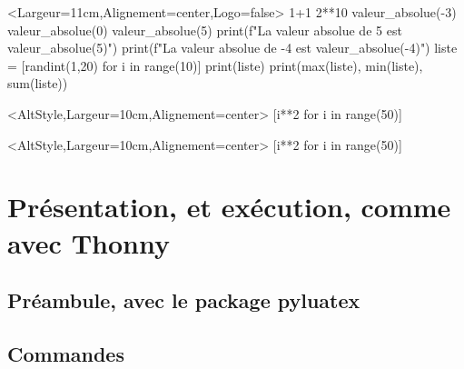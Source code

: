 \documentclass[french,a4paper,10pt]{article}
\begin{document}
\begin{ConsolePiton}<Largeur=11cm,Alignement=center,Logo=false>{}
1+1
2**10
valeur_absolue(-3)
valeur_absolue(0)
valeur_absolue(5)
print(f"La valeur absolue de 5 est {valeur_absolue(5)}")
print(f"La valeur absolue de -4 est {valeur_absolue(-4)}")
liste = [randint(1,20) for i in range(10)]
print(liste)
print(max(liste), min(liste), sum(liste))
\end{ConsolePiton}

{\small \begin{codehigh}
\begin{ConsolePiton}<AltStyle,Largeur=10cm,Alignement=center>{}
[i**2 for i in range(50)]
\end{ConsolePiton}
\end{codehigh}}

\begin{ConsolePiton}<AltStyle,Largeur=10cm,Alignement=center>{}
[i**2 for i in range(50)]
\end{ConsolePiton}

\pagebreak

\section{Présentation, et exécution, comme avec Thonny}

\subsection{Préambule, avec le package pyluatex}

{\small {}}

\subsection{Commandes}
\end{document}
